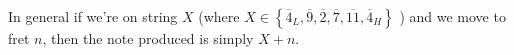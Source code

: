 \documentclass[preview]{standalone}
\begin{document}
\begin{center}
In general  if we're on string $X$ (where $X \in \left\{\overline{4}_L, \overline{9}, \overline{2}, \overline{7}, \overline{11}, \overline{4}_H  \right\}$ ) and we move to fret $n$, then the note produced is simply $X + n$.
\end{center}
\end{document}
